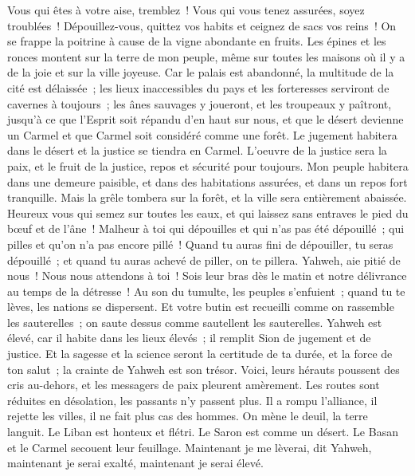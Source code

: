 \begin{multicols}{2}
Vous qui êtes à votre aise, tremblez~! Vous qui vous tenez assurées, soyez troublées~! Dépouillez-vous, quittez vos habits et ceignez de sacs vos reins~!
On se frappe la poitrine à cause de la vigne abondante en fruits.
Les épines et les ronces montent sur la terre de mon peuple, même sur toutes les maisons où il y a de la joie et sur la ville joyeuse.
Car le palais est abandonné, la multitude de la cité est délaissée~; les lieux inaccessibles du pays et les forteresses serviront de cavernes à toujours~; les ânes sauvages y joueront, et les troupeaux y paîtront,
jusqu'à ce que l'Esprit soit répandu d'en haut sur nous, et que le désert devienne un Carmel et que Carmel soit considéré comme une forêt.
Le jugement habitera dans le désert et la justice se tiendra en Carmel.
L'oeuvre de la justice sera la paix, et le fruit de la justice, repos et sécurité pour toujours.
Mon peuple habitera dans une demeure paisible, et dans des habitations assurées, et dans un repos fort tranquille.
Mais la grêle tombera sur la forêt, et la ville sera entièrement abaissée.
Heureux vous qui semez sur toutes les eaux, et qui laissez sans entraves le pied du bœuf et de l'âne~!
\VerseOne{}Malheur à toi qui dépouilles et qui n'as pas été dépouillé~; qui pilles et qu'on n'a pas encore pillé~! Quand tu auras fini de dépouiller, tu seras dépouillé~; et quand tu auras achevé de piller, on te pillera.
Yahweh, aie pitié de nous~! Nous nous attendons à toi~! Sois leur bras dès le matin et notre délivrance au temps de la détresse~!
Au son du tumulte, les peuples s'enfuient~; quand tu te lèves, les nations se dispersent.
Et votre butin est recueilli comme on rassemble les sauterelles~; on saute dessus comme sautellent les sauterelles.
Yahweh est élevé, car il habite dans les lieux élevés~; il remplit Sion de jugement et de justice.
Et la sagesse et la science seront la certitude de ta durée, et la force de ton salut~; la crainte de Yahweh est son trésor.
Voici, leurs hérauts poussent des cris au-dehors, et les messagers de paix pleurent amèrement.
Les routes sont réduites en désolation, les passants n'y passent plus. Il a rompu l'alliance, il rejette les villes, il ne fait plus cas des hommes.
On mène le deuil, la terre languit. Le Liban est honteux et flétri. Le Saron est comme un désert. Le Basan et le Carmel secouent leur feuillage.
Maintenant je me lèverai, dit Yahweh, maintenant je serai exalté, maintenant je serai élevé.

\end{multicols}
